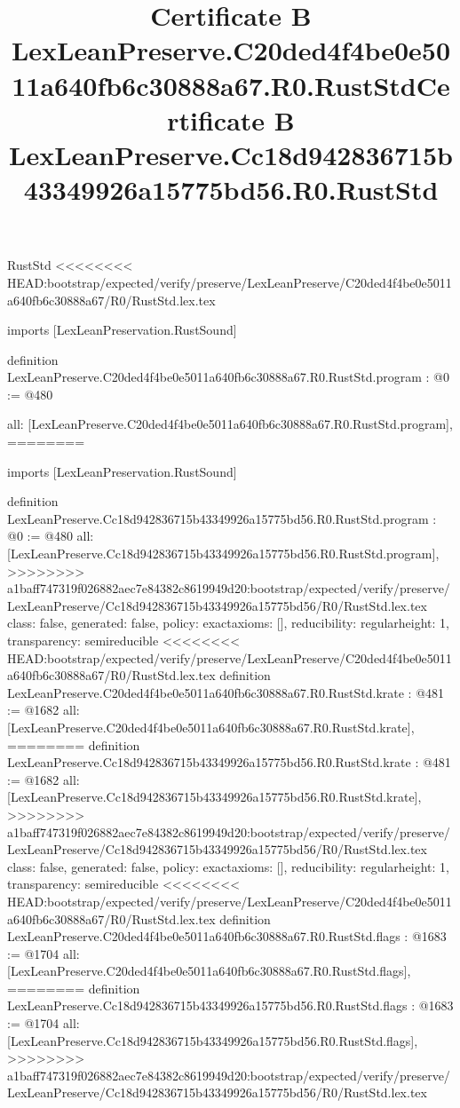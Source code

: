 \begin{lexlean}{RustStd}
<<<<<<<< HEAD:bootstrap/expected/verify/preserve/LexLeanPreserve/C20ded4f4be0e5011a640fb6c30888a67/R0/RustStd.lex.tex
\title{Certificate B LexLeanPreserve.C20ded4f4be0e5011a640fb6c30888a67.R0.RustStd}
\begin{coremodule}
imports [LexLeanPreservation.RustSound]

definition LexLeanPreserve.C20ded4f4be0e5011a640fb6c30888a67.R0.RustStd.program : @0 := @480 {
  all: [LexLeanPreserve.C20ded4f4be0e5011a640fb6c30888a67.R0.RustStd.program],
========
\title{Certificate B LexLeanPreserve.Cc18d942836715b43349926a15775bd56.R0.RustStd}
\begin{coremodule}
imports [LexLeanPreservation.RustSound]

definition LexLeanPreserve.Cc18d942836715b43349926a15775bd56.R0.RustStd.program : @0 := @480 {
  all: [LexLeanPreserve.Cc18d942836715b43349926a15775bd56.R0.RustStd.program],
>>>>>>>> a1baff747319f026882aec7e84382c8619949d20:bootstrap/expected/verify/preserve/LexLeanPreserve/Cc18d942836715b43349926a15775bd56/R0/RustStd.lex.tex
  class: false,
  generated: false,
  policy: exact{axioms: []},
  reducibility: regular{height: 1},
  transparency: semireducible
}
<<<<<<<< HEAD:bootstrap/expected/verify/preserve/LexLeanPreserve/C20ded4f4be0e5011a640fb6c30888a67/R0/RustStd.lex.tex
definition LexLeanPreserve.C20ded4f4be0e5011a640fb6c30888a67.R0.RustStd.krate : @481 := @1682 {
  all: [LexLeanPreserve.C20ded4f4be0e5011a640fb6c30888a67.R0.RustStd.krate],
========
definition LexLeanPreserve.Cc18d942836715b43349926a15775bd56.R0.RustStd.krate : @481 := @1682 {
  all: [LexLeanPreserve.Cc18d942836715b43349926a15775bd56.R0.RustStd.krate],
>>>>>>>> a1baff747319f026882aec7e84382c8619949d20:bootstrap/expected/verify/preserve/LexLeanPreserve/Cc18d942836715b43349926a15775bd56/R0/RustStd.lex.tex
  class: false,
  generated: false,
  policy: exact{axioms: []},
  reducibility: regular{height: 1},
  transparency: semireducible
}
<<<<<<<< HEAD:bootstrap/expected/verify/preserve/LexLeanPreserve/C20ded4f4be0e5011a640fb6c30888a67/R0/RustStd.lex.tex
definition LexLeanPreserve.C20ded4f4be0e5011a640fb6c30888a67.R0.RustStd.flags : @1683 := @1704 {
  all: [LexLeanPreserve.C20ded4f4be0e5011a640fb6c30888a67.R0.RustStd.flags],
========
definition LexLeanPreserve.Cc18d942836715b43349926a15775bd56.R0.RustStd.flags : @1683 := @1704 {
  all: [LexLeanPreserve.Cc18d942836715b43349926a15775bd56.R0.RustStd.flags],
>>>>>>>> a1baff747319f026882aec7e84382c8619949d20:bootstrap/expected/verify/preserve/LexLeanPreserve/Cc18d942836715b43349926a15775bd56/R0/RustStd.lex.tex
}}}
\end{coremodule}}
\end{coremodule}
\end{lexlean}
